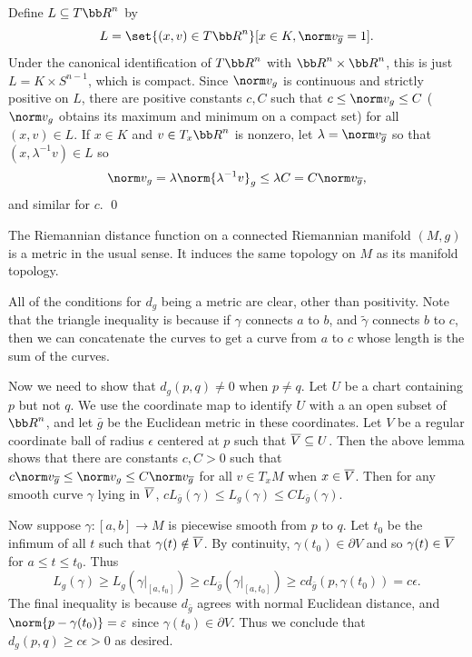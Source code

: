     Define $L\subseteq T\bR^n$ by
    $$ L = \set{(x,v)\in T\bR^n}[x\in K,\norm v_{\bar g}=1] . $$
    Under the canonical identification of $T\bR^n$ with $\bR^n\times\bR^n$, this is just $L=K\times S^{n-1}$, which is compact.
    Since $\norm v_g$ is continuous and strictly positive on $L$, there are positive constants $c,C$ such that $c\leq\norm v_g\leq C$ ($\norm v_g$
    obtains its maximum and minimum on a compact set) for all $(x,v)\in L$.
    If $x\in K$ and $v\in T_x\bR^n$ is nonzero, let $\lambda=\norm v_{\bar g}$ so that $(x,\lambda^{-1}v)\in L$ so
    $$ \norm v_g = \lambda\norm{\lambda^{-1}v}_g \leq \lambda C = C\norm v_{\bar g}, $$
    and similar for $c$.
    \qed

\eproof

\bthrm

    The Riemannian distance function on a connected Riemannian manifold $(M,g)$ is a metric in the usual sense.
    It induces the same topology on $M$ as its manifold topology.

\ethrm

\bproof

    All of the conditions for $d_g$ being a metric are clear, other than positivity.
    Note that the triangle inequality is because if $\gamma$ connects $a$ to $b$, and $\tilde\gamma$ connects $b$ to $c$, then we can concatenate the curves
    to get a curve from $a$ to $c$ whose length is the sum of the curves.

    Now we need to show that $d_g(p,q)\neq0$ when $p\neq q$.
    Let $U$ be a chart containing $p$ but not $q$.
    We use the coordinate map to identify $U$ with a an open subset of $\bR^n$, and let $\bar g$ be the Euclidean metric in these coordinates.
    Let $V$ be a regular coordinate ball of radius $\epsilon$ centered at $p$ such that $\overline V\subseteq U$.
    Then the above lemma shows that there are constants $c,C>0$ such that $c\norm v_{\bar g}\leq\norm v_g\leq C\norm v_{\bar g}$ for all $v\in T_xM$ when $x\in\overline V$.
    Then for any smooth curve $\gamma$ lying in $\overline V$, $cL_{\bar g}(\gamma)\leq L_g(\gamma)\leq CL_{\bar g}(\gamma)$.

    Now suppose $\gamma\colon[a,b]\to M$ is piecewise smooth from $p$ to $q$.
    Let $t_0$ be the infimum of all $t$ such that $\gamma(t)\notin\overline V$.
    By continuity, $\gamma(t_0)\in\partial V$ and so $\gamma(t)\in\overline V$ for $a\leq t\leq t_0$.
    Thus
    $$ L_g(\gamma) \geq L_g(\gamma|_{[a,t_0]}) \geq cL_{\bar g}(\gamma|_{[a,t_0]}) \geq cd_{\bar g}(p,\gamma(t_0)) = c\epsilon . $$
    The final inequality is because $d_{\bar g}$ agrees with normal Euclidean distance, and $\norm{p-\gamma(t_0)}=\epsilon$ since $\gamma(t_0)\in\partial V$.
    Thus we conclude that $d_g(p,q)\geq c\epsilon>0$ as desired.

